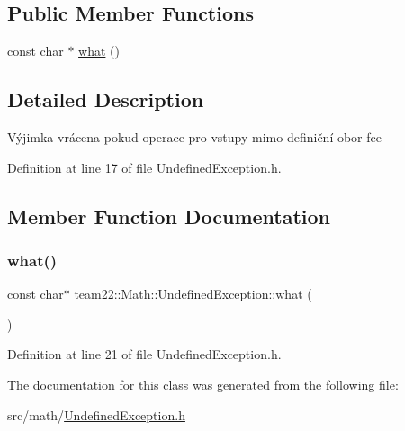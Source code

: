 \subsection*{Public Member Functions}
\begin{DoxyCompactItemize}
\item 
const char $\ast$ \hyperlink{classteam22_1_1_math_1_1_undefined_exception_a568d4e05844e57b984c3b37e3956d334}{what} ()
\end{DoxyCompactItemize}


\subsection{Detailed Description}
Výjimka vrácena pokud operace pro vstupy mimo definiční obor fce 

Definition at line 17 of file Undefined\+Exception.\+h.



\subsection{Member Function Documentation}
\mbox{\label{classteam22_1_1_math_1_1_undefined_exception_a568d4e05844e57b984c3b37e3956d334}} 
\subsubsection{\texorpdfstring{what()}{what()}}
{\footnotesize\ttfamily const char$\ast$ team22\+::\+Math\+::\+Undefined\+Exception\+::what (\begin{DoxyParamCaption}{ }\end{DoxyParamCaption})\hspace{0.3cm}{\ttfamily [inline]}}



Definition at line 21 of file Undefined\+Exception.\+h.



The documentation for this class was generated from the following file\+:\begin{DoxyCompactItemize}
\item 
src/math/\hyperlink{_undefined_exception_8h}{Undefined\+Exception.\+h}\end{DoxyCompactItemize}

